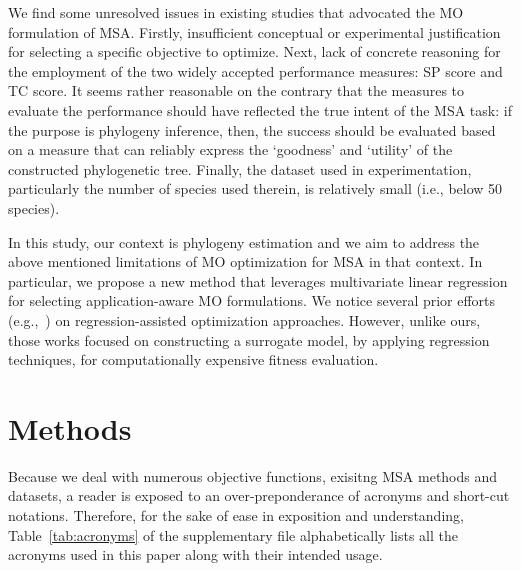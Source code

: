 We find some unresolved issues in existing studies that advocated the MO formulation of MSA. Firstly, insufficient conceptual or experimental justification for selecting a specific objective to optimize. Next, lack of concrete reasoning for the employment of the two widely accepted performance measures: SP score and TC score. It seems rather reasonable on the contrary that the measures to evaluate the performance should have  reflected the true intent of the MSA task: 
if the purpose is phylogeny inference, then, the success should be evaluated based on a measure that can reliably express the `goodness' and `utility' of the constructed phylogenetic tree. Finally, the dataset used in experimentation, particularly the number of species used therein, is relatively small (i.e., below 50 species).


In this study, our context is phylogeny estimation and we aim to address the above mentioned limitations of MO optimization for MSA in that context. In particular, we propose a new method that leverages multivariate linear regression for selecting application-aware MO formulations. We notice several prior efforts (e.g.,~\citep{lu2012classification, zhou2005study}) on regression-assisted optimization approaches. However, unlike ours, those works focused on constructing a surrogate model, by applying regression techniques, for computationally expensive fitness evaluation.


  \section{Methods}
\label{sec:methods}
Because we deal with numerous objective functions, exisitng MSA methods and datasets, a reader is exposed to an over-preponderance of acronyms and short-cut notations. Therefore, for the sake of ease in exposition and understanding, Table~\ref{tab:acronyms} of the supplementary file alphabetically lists all the acronyms used in this paper along with their intended usage.

